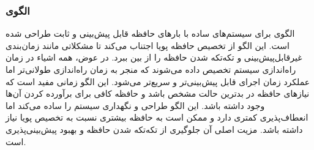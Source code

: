 \subsubsection{الگوی }
\label{memStaticAllocSec}
\begin{RTL}
الگوی  \cite{ref4} برای سیستم‌های ساده
با بارهای حافظه قابل پیش‌بینی و ثابت طراحی شده است.
این الگو از تخصیص حافظه پویا اجتناب می‌کند تا مشکلاتی مانند زمان‌بندی
غیرقابل‌پیش‌بینی و تکه‌تکه شدن حافظه را از بین ببرد. در عوض، همه اشیاء
در زمان راه‌اندازی سیستم تخصیص داده می‌شوند که منجر به زمان راه‌اندازی
طولانی‌تر اما عملکرد زمان اجرای قابل پیش‌بینی‌تر و سریع‌تر می‌شود.
این الگو زمانی مفید است که نیازهای حافظه در بدترین حالت مشخص باشد
و حافظه کافی برای برآورده کردن آن‌ها وجود داشته باشد.
این الگو طراحی و نگهداری سیستم را ساده می‌کند اما انعطاف‌پذیری کمتری دارد
و ممکن است به حافظه بیشتری نسبت به تخصیص پویا نیاز داشته باشد.
مزیت اصلی آن جلوگیری از تکه‌تکه شدن حافظه و بهبود پیش‌بینی‌پذیری است.
\end{RTL}